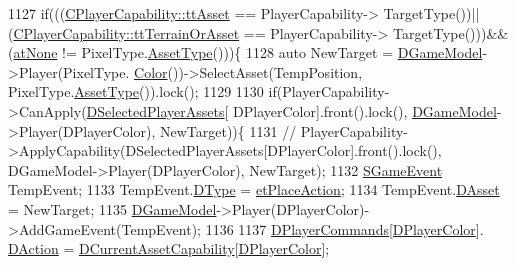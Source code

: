 \begin{DoxyCode}
1127                     \textcolor{keywordflow}{if}(((\hyperlink{classCPlayerCapability_a9d3450ed1532fd536bd6cbb1e2eef02facb6ee2a28b5d50b9d3009c272f2881aa}{CPlayerCapability::ttAsset} == PlayerCapability->
      TargetType())||(\hyperlink{classCPlayerCapability_a9d3450ed1532fd536bd6cbb1e2eef02fa67cc6d11bc0aafc1b786bd6557ba4aa2}{CPlayerCapability::ttTerrainOrAsset} == PlayerCapability->
      TargetType()))&&(\hyperlink{GameDataTypes_8h_a5600d4fc433b83300308921974477feca82fb51718e2c00981a2d37bc6fe92593}{atNone} != PixelType.\hyperlink{classCPixelType_addcf6c6d11e8ebafe4455beaa995b675}{AssetType}()))\{
1128                         \textcolor{keyword}{auto} NewTarget = \hyperlink{classCApplicationData_a32b50c7c1cbac3cfd67c7f775b1d6fee}{DGameModel}->Player(PixelType.
      \hyperlink{classCPixelType_a54864220447608dfad4cd579a5a4016c}{Color}())->SelectAsset(TempPosition, PixelType.\hyperlink{classCPixelType_addcf6c6d11e8ebafe4455beaa995b675}{AssetType}()).lock();
1129                         
1130                         \textcolor{keywordflow}{if}(PlayerCapability->CanApply(\hyperlink{classCApplicationData_a05c1087d5a5c4ddc14fcb37444f1642b}{DSelectedPlayerAssets}[
      DPlayerColor].front().lock(), \hyperlink{classCApplicationData_a32b50c7c1cbac3cfd67c7f775b1d6fee}{DGameModel}->Player(DPlayerColor), NewTarget))\{
1131                             \textcolor{comment}{//
      PlayerCapability->ApplyCapability(DSelectedPlayerAssets[DPlayerColor].front().lock(), DGameModel->Player(DPlayerColor), NewTarget);}
1132                             \hyperlink{structSGameEvent}{SGameEvent} TempEvent;
1133                             TempEvent.\hyperlink{structSGameEvent_afa10562e243f4ac2b473b655cc58fee7}{DType} = \hyperlink{GameModel_8h_abfcf510bafec7c6429906a6ecaac656da6b069d43a732ecd2eec5fbcebf3e41ee}{etPlaceAction};
1134                             TempEvent.\hyperlink{structSGameEvent_a40c85eeac83b96887b7449c9bdc5d624}{DAsset} = NewTarget;
1135                             \hyperlink{classCApplicationData_a32b50c7c1cbac3cfd67c7f775b1d6fee}{DGameModel}->Player(DPlayerColor)->AddGameEvent(TempEvent);
1136                             
1137                             \hyperlink{classCApplicationData_a2df1addeb7622233f72dc056bbcf31a1}{DPlayerCommands}[\hyperlink{classCApplicationData_a53550939b20cba70570f113e4d1c5d02}{DPlayerColor}].
      \hyperlink{structSPlayerCommandRequest_a80897bbccf2c4e0b148a7aa815a926c6}{DAction} = \hyperlink{classCApplicationData_a7e0dbfdc54f73dfa9838ae81b8017e2d}{DCurrentAssetCapability}[\hyperlink{classCApplicationData_a53550939b20cba70570f113e4d1c5d02}{DPlayerColor}];

\end{DoxyCode}
